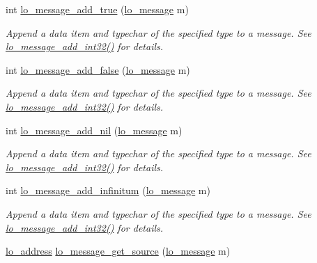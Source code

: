 \begin{DoxyCompactItemize}
int \hyperlink{group__liblolowlevel_ga9da3df4838126910171a8e45ea34e9ec}{lo\-\_\-message\-\_\-add\-\_\-true} (\hyperlink{lo__types_8h_ad126083c98d941f00eb72d1690b38d63}{lo\-\_\-message} m)
\begin{DoxyCompactList}\small\item\em \-Append a data item and typechar of the specified type to a message. \-See \hyperlink{group__liblolowlevel_ga7c9df1bd975a32fb6c8105e6fe327149}{lo\-\_\-message\-\_\-add\-\_\-int32()} for details. \end{DoxyCompactList}\item 
int \hyperlink{group__liblolowlevel_ga1c8a136e87e3d2befeb466e0a8a5a4ad}{lo\-\_\-message\-\_\-add\-\_\-false} (\hyperlink{lo__types_8h_ad126083c98d941f00eb72d1690b38d63}{lo\-\_\-message} m)
\begin{DoxyCompactList}\small\item\em \-Append a data item and typechar of the specified type to a message. \-See \hyperlink{group__liblolowlevel_ga7c9df1bd975a32fb6c8105e6fe327149}{lo\-\_\-message\-\_\-add\-\_\-int32()} for details. \end{DoxyCompactList}\item 
int \hyperlink{group__liblolowlevel_gabd3cd7f86137ae1a180e33c3bc5c9644}{lo\-\_\-message\-\_\-add\-\_\-nil} (\hyperlink{lo__types_8h_ad126083c98d941f00eb72d1690b38d63}{lo\-\_\-message} m)
\begin{DoxyCompactList}\small\item\em \-Append a data item and typechar of the specified type to a message. \-See \hyperlink{group__liblolowlevel_ga7c9df1bd975a32fb6c8105e6fe327149}{lo\-\_\-message\-\_\-add\-\_\-int32()} for details. \end{DoxyCompactList}\item 
int \hyperlink{group__liblolowlevel_ga4cbd7d3834a67446b15f53acf316a72a}{lo\-\_\-message\-\_\-add\-\_\-infinitum} (\hyperlink{lo__types_8h_ad126083c98d941f00eb72d1690b38d63}{lo\-\_\-message} m)
\begin{DoxyCompactList}\small\item\em \-Append a data item and typechar of the specified type to a message. \-See \hyperlink{group__liblolowlevel_ga7c9df1bd975a32fb6c8105e6fe327149}{lo\-\_\-message\-\_\-add\-\_\-int32()} for details. \end{DoxyCompactList}\item 
\hyperlink{lo__types_8h_abf9b53223467de596b89e1377b0f3f3d}{lo\-\_\-address} \hyperlink{group__liblolowlevel_ga1f4e07e4f8b67edc98f4b300412a3dbb}{lo\-\_\-message\-\_\-get\-\_\-source} (\hyperlink{lo__types_8h_ad126083c98d941f00eb72d1690b38d63}{lo\-\_\-message} m)

\end{DoxyCompactItemize}
